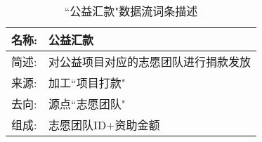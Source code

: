 \begin{table}[H]  
\caption{``公益汇款"数据流词条描述}  
\begin{center}  
    \begin{tabular}{l p{11cm}} 
        \hline
        \quad 名称:  &  公益汇款 \\
        \hline
        \quad 简述:  & 对公益项目对应的志愿团队进行捐款发放 \\
        \hline
        \quad 来源:  & 加工``项目打款" \\
        \hline
        \quad 去向:  & 源点``志愿团队" \\
        \hline
        \quad 组成:  & 志愿团队ID+资助金额 \\
        \hline
    \end{tabular}
    \label{tab1}
\end{center}
\end{table}

